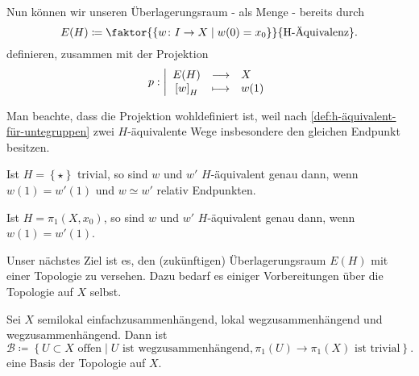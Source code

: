 Nun können wir unseren Überlagerungsraum - als Menge - bereits durch
\[
    E(H) \coloneqq  \faktor{\left \{w\colon  I \to  X \mid  w(0) = x_0\right\} }{\text{H-Äquivalenz}}
.\] 
definieren, zusammen mit der Projektion
    \begin{equation*}
    p: \left| \begin{array}{c c l} 
        E(H) & \longrightarrow & X \\
        \left[w\right]_H & \longmapsto &  w(1)
    \end{array} \right.
\end{equation*}

\begin{remark*}
    Man beachte, dass die Projektion wohldefiniert ist, weil nach \autoref{def:h-äquivalent-für-untegruppen} zwei $H$-äquivalente Wege insbesondere den gleichen Endpunkt besitzen. 
\end{remark*}


 \begin{example}
     Ist $H = \left \{\star\right\} $ trivial, so sind $w$ und  $w'$  $H$-äquivalent genau dann, wenn  $w(1) = w'(1)$ und  $w \simeq w'$ relativ Endpunkten.

     Ist  $H = \pi_1(X,x_0)$, so sind $w$ und  $w'$  $H$-äquivalent genau dann, wenn  $w(1) = w'(1)$.
\end{example}

Unser nächstes Ziel ist es, den (zukünftigen) Überlagerungsraum $E(H)$ mit einer Topologie zu versehen. Dazu bedarf es einiger Vorbereitungen über die Topologie auf $X$ selbst.

\begin{lemma}\label{lm:basis-vonsemilokal-einfachzusammenhängendem-zusammenhängendem-raum}
    Sei $X$ semilokal einfachzusammenhängend, lokal wegzusammenhängend und wegzusammenhängend. Dann ist
     \[
         \mathcal{B} \coloneqq  \left \{U\subset X \text{ offen}\mid  U \text{ ist wegzusammenhängend}, \pi_1(U) \to  \pi_1(X) \text{ ist trivial}\right\} 
    .\] 
    eine Basis der Topologie auf $X$.
\end{lemma}



